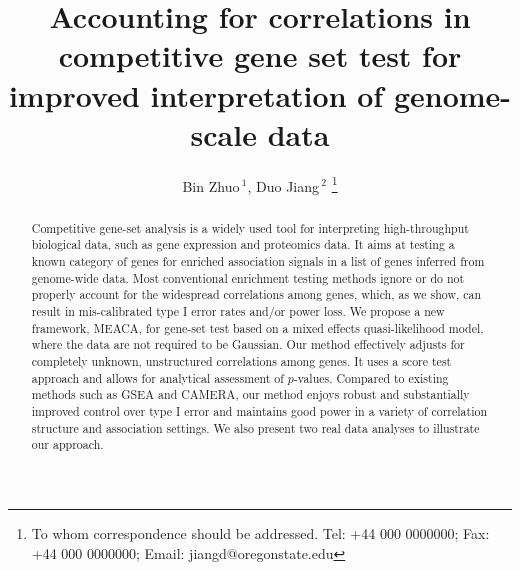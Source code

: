 \documentclass[a4,center,fleqn]{NAR}
\newcommand{\OurMethod}{MEACA}
\begin{document}
	
	
	\title{Accounting for correlations in competitive gene set
		test for improved interpretation of genome-scale data}
	
	\author{%
		Bin Zhuo\,$^{1}$,
		Duo Jiang\,$^{2}$
		\footnote{To whom correspondence should be addressed.
			Tel: +44 000 0000000; Fax: +44 000 0000000; Email: jiangd@oregonstate.edu}}
	
	\address{%
		$^{1, 2}$Department of Statistics, Oregon State University, 239 Weniger Hall, Corvallis, 
		OR, 97331, USA}
	
	
	\maketitle
	
	
	
	
	
	
	
	\begin{abstract}
	Competitive gene-set analysis is a widely used tool for interpreting high-throughput biological 
	data, such as gene expression and proteomics data. It aims at testing a known category of genes 
	for enriched association signals in a list of genes inferred from genome-wide data. Most 
	conventional enrichment testing methods ignore or do not properly account for the widespread 
	correlations among genes, which, as we show, can result in mis-calibrated type I error rates 
	and/or power loss. We propose a new framework, \OurMethod, for gene-set test based on a mixed 
	effects quasi-likelihood model, where the data are not required to be Gaussian. Our method 
	effectively adjusts for completely unknown,	unstructured correlations among genes. It uses a 
	score test approach and allows for analytical assessment of $p$-values. Compared to existing 
	methods such as GSEA and CAMERA, our method enjoys robust and substantially improved control 
	over type I error and maintains good power in a variety of correlation structure and 
	association settings. We also present two real data analyses to illustrate our approach.
	\end{abstract}
	
\end{document}
